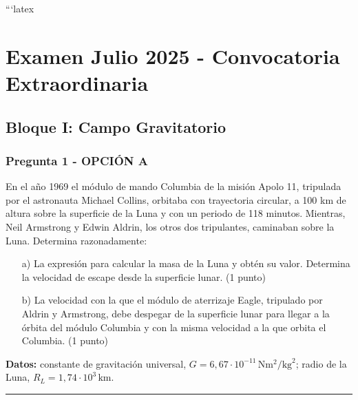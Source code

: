 ```latex
\chapter{Examen Julio 2025 - Convocatoria Extraordinaria}
\label{chap:2025_jul_ord}

\section{Bloque I: Campo Gravitatorio}
\label{sec:grav_2025_jul_ord}

\subsection{Pregunta 1 - OPCIÓN A}
\label{subsec:1A_2025_jul_ord}

\begin{cajaenunciado}
En el año 1969 el módulo de mando Columbia de la misión Apolo 11, tripulada por el astronauta Michael Collins, orbitaba con trayectoria circular, a 100 km de altura sobre la superficie de la Luna y con un periodo de 118 minutos. Mientras, Neil Armstrong y Edwin Aldrin, los otros dos tripulantes, caminaban sobre la Luna. Determina razonadamente:
\begin{enumerate}
    \item[a)] La expresión para calcular la masa de la Luna y obtén su valor. Determina la velocidad de escape desde la superficie lunar. (1 punto)
    \item[b)] La velocidad con la que el módulo de aterrizaje Eagle, tripulado por Aldrin y Armstrong, debe despegar de la superficie lunar para llegar a la órbita del módulo Columbia y con la misma velocidad a la que orbita el Columbia. (1 punto)
\end{enumerate}
\textbf{Datos:} constante de gravitación universal, $G=6,67\cdot10^{-11}\,\text{N}\text{m}^2/\text{kg}^2$; radio de la Luna, $R_{L}=1,74\cdot10^{3}\,\text{km}$.
\end{cajaenunciado}
\hrule

